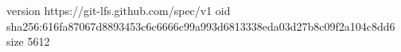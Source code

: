 version https://git-lfs.github.com/spec/v1
oid sha256:616fa87067d8893453c6c6666c99a993d6813338eda03d27b8c09f2a104c8dd6
size 5612
